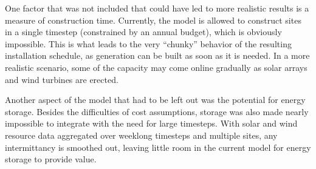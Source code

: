 \documentclass[12pt,letterpaper,fleqn]{report}
\begin{document}
One factor that was not included that could have led to more realistic
results is a measure of construction time. Currently, the model is
allowed to construct sites in a single timestep (constrained by an
annual budget), which is obviously impossible. This is what leads to
the very ``chunky'' behavior of the resulting installation schedule,
as generation can be built as soon as it is needed. In a more
realistic scenario, some of the capacity may come online gradually as
solar arrays and wind turbines are erected.

Another aspect of the model that had to be left out was the potential
for energy storage. Besides the difficulties of cost assumptions,
storage was also made nearly impossible to integrate with the need for
large timesteps. With solar and wind resource data aggregated over
weeklong timesteps and multiple sites, any intermittancy is smoothed
out, leaving little room in the current model for energy storage to
provide value.
\end{document}

